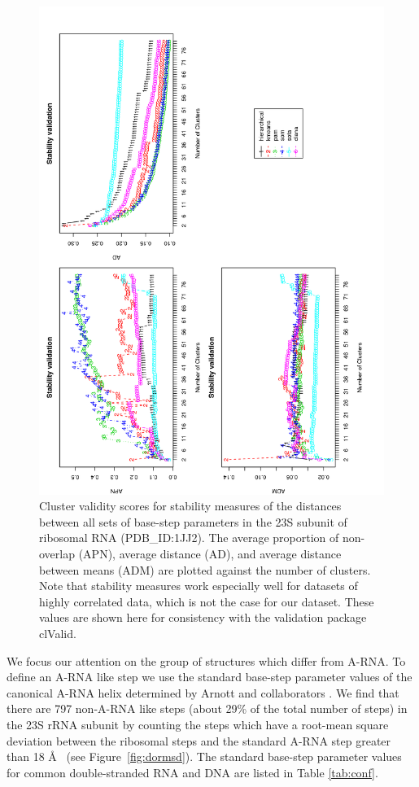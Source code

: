 \begin{figure}
 \centering
\includegraphics[angle=0, scale=0.34]{Chapter2/STval_sta.png}
\caption{Cluster  validity  scores   for  stability  measures  of  the
  distances  between  all sets  of  base-step  parameters  in the  23S
  subunit of  ribosomal RNA (PDB\_ID:1JJ2). The  average proportion of
  non-overlap  (APN),  average  distance  (AD), and  average  distance
  between  means (ADM)  are plotted  against the  number  of clusters.
  Note that  stability measures work  especially well for  datasets of
  highly  correlated data,  which is  not  the case  for our  dataset.
  These  values are  shown here  for consistency  with  the validation
  package clValid.}
 \label{fig:stability}
\end{figure}

We focus  our attention on the  group of structures  which differ from
A-RNA.  To  define an  A-RNA like step  we use the  standard base-step
parameter values of the canonical A-RNA helix determined by Arnott and
collaborators \cite{arnott1973}.  We find that there are 797 non-A-RNA
like steps (about  29\% of the total number of steps)  in the 23S rRNA
subunit by counting the steps  which have a root-mean square deviation
between the ribosomal  steps and the standard A-RNA  step greater than
18 \AA~ (see Figure~\ref{fig:dormsd}). The standard base-step parameter
values  for common  double-stranded RNA  and DNA  are listed  in Table
\ref{tab:conf}.

